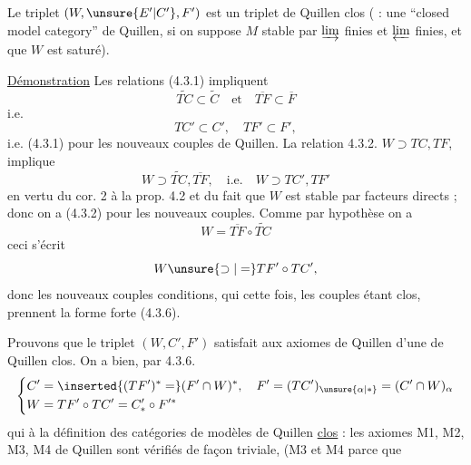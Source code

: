 Le triplet $(W,\unsure{E'|C'},F')$ est un triplet de Quillen clos ( : une ``closed model category'' de Quillen,  si on suppose $M$ stable par $\varinjlim$ finies et $\varprojlim$ finies, et que $W$  est  saturé).

\uline{Démonstration} Les relations (4.3.1) impliquent
\[
\widetilde{TC}\subset\widetilde C\quad\text{et}\quad\overline{TF}\subset\overline F
\]
i.e.
\[
TC'\subset C',\quad TF'\subset F',
\]
i.e. (4.3.1) pour les nouveaux couples de Quillen. La relation 4.3.2. $W\supset TC,TF$, implique
\[
W\supset\widetilde{TC},\overline{TF},\quad\text{i.e.}\quad W\supset TC',TF'
\]
en vertu du cor. 2 à la prop. 4.2 et du fait que $W$ est stable par facteurs directs ;  donc on a (4.3.2) pour les nouveaux couples. Comme par hypothèse on a
\[
W=\overline{TF}\circ\widetilde{TC}
\]
ceci s'écrit
\[
W\unsure{\supset|=}TF'\circ TC',
\]
donc les nouveaux couples    conditions, qui cette fois, les couples étant clos, prennent la forme forte (4.3.6).

Prouvons que le triplet $(W,C',F')$ satisfait aux axiomes de Quillen d'une   de Quillen clos. On a bien, par 4.3.6.
\[
\left\{\begin{aligned}
C'&=\inserted{(TF')^*=}(F'\cap W)^*,\quad F'=(TC')_{\unsure{\alpha|*}}=(C'\cap W)_\alpha\\
W&=TF'\circ TC'=C'_*\circ F'^*
\end{aligned}\right.
\]
qui  à la définition des catégories de modèles de Quillen \uline{clos} : les axiomes M1,  M2, M3, M4 de Quillen sont vérifiés de façon triviale,  (M3 et M4 parce que

